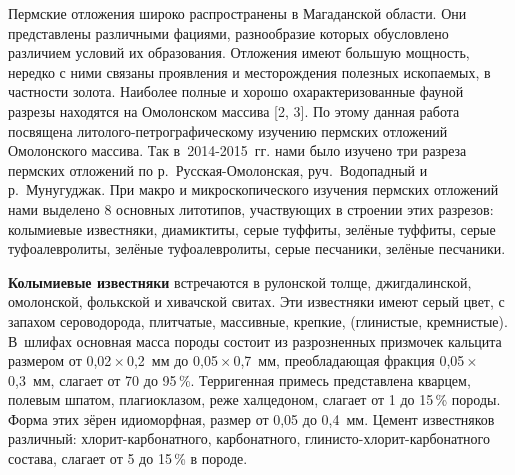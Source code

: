 




\makeProcTitleII
{}

Пермские отложения широко распространены в Магаданской области. Они представлены различными фациями, разнообразие которых обусловлено различием условий их образования. Отложения имеют большую мощность, нередко с ними связаны проявления и месторождения полезных ископаемых, в частности золота. Наиболее полные и хорошо охарактеризованные фауной разрезы находятся на Омолонском массива [2, 3]. По этому данная работа посвящена литолого-петрографическому изучению пермских отложений Омолонского массива. Так в~2014-2015~гг. нами было изучено три разреза пермских отложений по р.~Русская-Омолонская, руч.~Водопадный и р.~Мунугуджак. При макро и микроскопического изучения пермских отложений нами выделено 8 основных литотипов, участвующих в строении этих разрезов: колымиевые известняки, диамиктиты, серые туффиты, зелёные туффиты, серые туфоалевролиты, зелёные туфоалевролиты, серые песчаники, зелёные песчаники.

\textbf{Колымиевые известняки} встречаются в рулонской толще, джигдалинской, омолонской, фолькской и хивачской свитах. Эти известняки имеют серый цвет, с запахом сероводорода, плитчатые, массивные, крепкие, (глинистые, кремнистые). В~шлифах основная масса породы состоит из разрозненных призмочек кальцита размером от 0,02\,$\times$\,0,2~мм до 0,05\,$\times$\,0,7~мм, преобладающая фракция 0,05\,$\times$\,0,3~мм, слагает от 70 до 95\,\%. Терригенная примесь представлена кварцем, полевым шпатом, плагиоклазом, реже халцедоном, слагает от 1 до 15\,\% породы. Форма этих зёрен идиоморфная, размер от 0,05 до 0,4~мм. Цемент известняков различный: хлорит-карбонатного, карбонатного, глинисто-хлорит-карбонатного состава, слагает от 5 до 15\,\% в породе.

